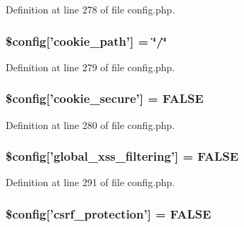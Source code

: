 Definition at line 278 of file config.\-php.

\hypertarget{application_2config_2config_8php_aeadefdcde429770b04a079e002194d2f}{
\subsubsection[{\$config}]{\setlength{\rightskip}{0pt plus 5cm}\$config\mbox{[}'cookie\-\_\-path'\mbox{]} = \char`\"{}/\char`\"{}}}\label{application_2config_2config_8php_aeadefdcde429770b04a079e002194d2f}


Definition at line 279 of file config.\-php.

\hypertarget{application_2config_2config_8php_a7d66abd075b76c2fdcd0837068a13b51}{
\subsubsection[{\$config}]{\setlength{\rightskip}{0pt plus 5cm}\$config\mbox{[}'cookie\-\_\-secure'\mbox{]} = F\-A\-L\-S\-E}}\label{application_2config_2config_8php_a7d66abd075b76c2fdcd0837068a13b51}


Definition at line 280 of file config.\-php.

\hypertarget{application_2config_2config_8php_afee3589eecfa5ebecf39f44c271d58ce}{
\subsubsection[{\$config}]{\setlength{\rightskip}{0pt plus 5cm}\$config\mbox{[}'global\-\_\-xss\-\_\-filtering'\mbox{]} = F\-A\-L\-S\-E}}\label{application_2config_2config_8php_afee3589eecfa5ebecf39f44c271d58ce}


Definition at line 291 of file config.\-php.

\hypertarget{application_2config_2config_8php_a37f959c7a92cefa11c0df7db2b83c89f}{
\subsubsection[{\$config}]{\setlength{\rightskip}{0pt plus 5cm}\$config\mbox{[}'csrf\-\_\-protection'\mbox{]} = F\-A\-L\-S\-E}}\label{application_2config_2config_8php_a37f959c7a92cefa11c0df7db2b83c89f}


